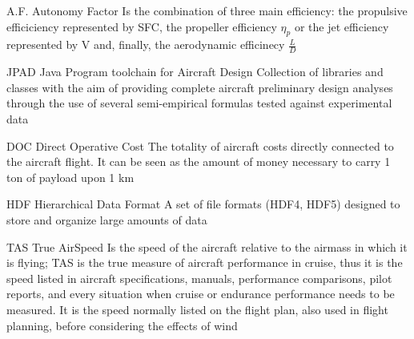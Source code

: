 %
%



  {A.F.}            %
  {Autonomy Factor}  %
  {Is the combination of three main efficiency: the propulsive efficiciency represented by SFC, the propeller efficiency $\eta_{p}$ or the jet efficiency represented by V and, finally, the aerodynamic efficinecy $\frac{L}{D}$} %

  {JPAD}            %
  {Java Program toolchain for Aircraft Design}  %
  {Collection of libraries and classes with the aim of providing complete aircraft preliminary design analyses through the use of several semi-empirical formulas tested against experimental data} %


%
  {DOC}            %
  {Direct Operative Cost}  %
  {The totality of aircraft costs directly connected to the aircraft flight. It can be seen as the amount of money necessary to carry 1 ton of payload upon 1 km}

%
  {HDF}            %
  {Hierarchical Data Format}  %
  {A set of file formats (HDF4, HDF5) designed to store and organize large amounts of data}
  
%
  {TAS}            %
  {True AirSpeed}  %
  {Is the speed of the aircraft relative to the airmass in which it is flying; TAS is the true measure of aircraft performance in cruise, thus it is the speed listed in aircraft specifications, manuals, performance comparisons, pilot reports, and every situation when cruise or endurance performance needs to be measured. It is the speed normally listed on the flight plan, also used in flight planning, before considering the effects of wind}
  
